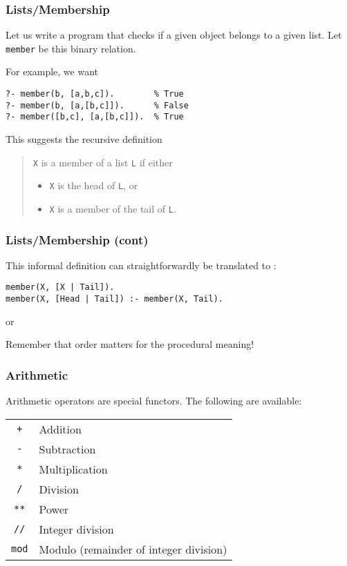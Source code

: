 %
\begin{frame}[containsverbatim]
\frametitle{Lists/Membership}

Let us write a \Prolog program that checks if a given object belongs
to a given list. Let \texttt{member} be this binary relation.

\bigskip

For example, we want
{\small
\begin{verbatim}
?- member(b, [a,b,c]).        % True
?- member(b, [a,[b,c]]).      % False
?- member([b,c], [a,[b,c]]).  % True
\end{verbatim}
}
This suggests the recursive definition
{\it
\begin{quote}
\texttt{X} is a member of a list \texttt{L} if either
\begin{itemize}

  \item \texttt{X} is the head of \texttt{L}, or

  \item \texttt{X} is a member of the tail of \texttt{L}.

\end{itemize}
\end{quote}
}
\end{frame}

%
\begin{frame}[containsverbatim]
\frametitle{Lists/Membership (cont)}

This informal definition can straightforwardly be translated to
\Prolog:
{\small
\begin{verbatim}
member(X, [X | Tail]).
member(X, [Head | Tail]) :- member(X, Tail).
\end{verbatim}
}
or


Remember that order matters for the procedural meaning!
 
\end{frame}

%
\begin{frame}[containsverbatim]
\frametitle{Arithmetic}

Arithmetic operators are special functors. The following are available:

\bigskip

\begin{tabular}{cl}
  \texttt{+}   & Addition\\
  \texttt{-}   & Subtraction\\
  \texttt{*}   & Multiplication\\
  \texttt{/}   & Division\\
  \texttt{**}  & Power\\
  \texttt{//}  & Integer division\\
  \texttt{mod} & Modulo (remainder of integer division)
\end{tabular}

\end{frame}

